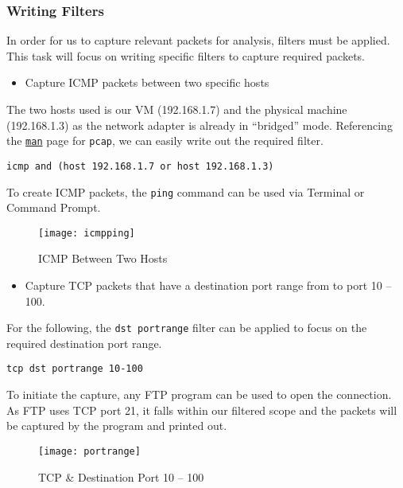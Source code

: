 \documentclass[a4paper,12pt]{article}
\begin{document}
\subsubsection{Writing Filters}
In order for us to capture relevant packets for analysis, filters must be applied. This task will focus on writing specific filters to capture required packets.
\begin{itemize}
\item Capture ICMP packets between two specific hosts
\end{itemize}
The two hosts used is our VM (192.168.1.7) and the physical machine (192.168.1.3) as the network adapter is already in ``bridged'' mode. Referencing the \href{https://www.tcpdump.org/manpages/pcap-filter.7.html}{\texttt{man}} page for \texttt{pcap}, we can easily write out the required filter.
\begin{verbatim}
icmp and (host 192.168.1.7 or host 192.168.1.3)
\end{verbatim}
To create ICMP packets, the \texttt{ping} command can be used via Terminal or Command Prompt. 
\begin{figure}[H]
\centering
\texttt{[image: icmpping]}
\caption{ICMP Between Two Hosts}
\label{fig:icmpping}
\end{figure}

\begin{itemize}
\item Capture TCP packets that have a destination port range from to port 10 -- 100.
\end{itemize}
For the following, the \texttt{dst portrange} filter can be applied to focus on the required destination port range. 
\begin{verbatim}
tcp dst portrange 10-100
\end{verbatim}
To initiate the capture, any FTP program can be used to open the connection. As FTP uses TCP port 21, it falls within our filtered scope and the packets will be captured by the program and printed out.
\begin{figure}[H]
\centering
\texttt{[image: portrange]}
\caption{TCP \& Destination Port 10 -- 100}
\label{fig:portrange}
\end{figure}
\end{document}
